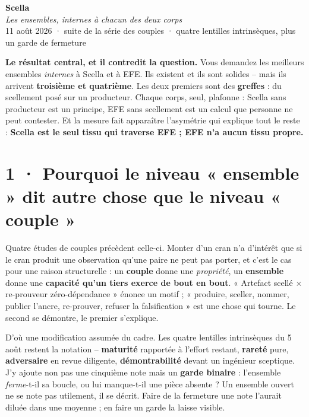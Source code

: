 \documentclass[10pt]{article}
\newcommand{\x}{$\times$}
\begin{document}
\begin{center}
{\Huge\bfseries\color{navy} Scella}\\[4pt]
{\large\color{grey}\itshape Les ensembles, internes à chacun des deux corps}\\[4pt]
{\small\color{grey} 11 août 2026 \; · \; suite de la série des couples \; · \; quatre lentilles intrinsèques, plus un garde de fermeture}
\end{center}
\vspace{2pt}

\begin{these}
\textbf{Le résultat central, et il contredit la question.} Vous demandez les meilleurs ensembles
\emph{internes} à Scella et à EFE. Ils existent et ils sont solides -- mais ils arrivent
\textbf{troisième et quatrième}. Les deux premiers sont des \textbf{greffes} : du scellement posé sur un
producteur. Chaque corps, seul, plafonne : Scella sans producteur est un principe, EFE sans scellement
est un calcul que personne ne peut contester. Et la mesure fait apparaître l'asymétrie qui explique
tout le reste : \textbf{Scella est le seul tissu qui traverse EFE ; EFE n'a aucun tissu propre.}
\end{these}

\section{1 · Pourquoi le niveau « ensemble » dit autre chose que le niveau « couple »}

Quatre études de couples précèdent celle-ci. Monter d'un cran n'a d'intérêt que si le cran produit une
observation qu'une paire ne peut pas porter, et c'est le cas pour une raison structurelle : un
\textbf{couple} donne une \emph{propriété}, un \textbf{ensemble} donne une \textbf{capacité qu'un tiers
exerce de bout en bout}. « Artefact scellé \x{} re-prouveur zéro-dépendance » énonce un motif ;
« produire, sceller, nommer, publier l'ancre, re-prouver, refuser la falsification » est une chose qui
tourne. Le second se démontre, le premier s'explique.

D'où une modification assumée du cadre. Les quatre lentilles intrinsèques du 5 août restent la
notation -- \textbf{maturité} rapportée à l'effort restant, \textbf{rareté} pure, \textbf{adversaire} en
revue diligente, \textbf{démontrabilité} devant un ingénieur sceptique. J'y ajoute non pas une
cinquième note mais un \textbf{garde binaire} : l'ensemble \emph{ferme}-t-il sa boucle, ou lui
manque-t-il une pièce absente ? Un ensemble ouvert ne se note pas utilement, il se décrit. Faire de la
fermeture une note l'aurait diluée dans une moyenne ; en faire un garde la laisse visible.
\end{document}
